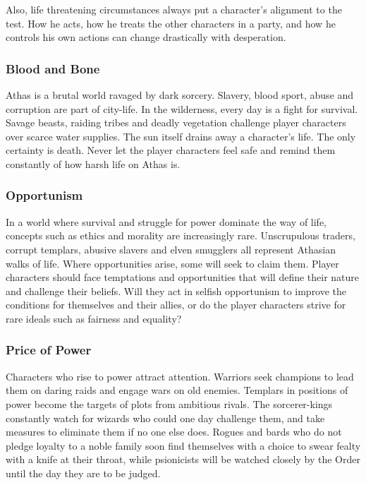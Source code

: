 Also, life threatening circumstances always put a character's alignment to the test. How he acts, how he treats the other characters in a party, and how he controls his own actions can change drastically with desperation.


\subsubsection{Blood and Bone}
Athas is a brutal world ravaged by dark sorcery. Slavery, blood sport, abuse and corruption are part of city-life. In the wilderness, every day is a fight for survival. Savage beasts, raiding tribes and deadly vegetation challenge player characters over scarce water supplies. The sun itself drains away a character's life. The only certainty is death. Never let the player characters feel safe and remind them constantly of how harsh life on Athas is.


\subsubsection{Opportunism}
In a world where survival and struggle for power dominate the way of life, concepts such as ethics and morality are increasingly rare. Unscrupulous traders, corrupt templars, abusive slavers and elven smugglers all represent Athasian walks of life. Where opportunities arise, some will seek to claim them. Player characters should face temptations and opportunities that will define their nature and challenge their beliefs. Will they act in selfish opportunism to improve the conditions for themselves and their allies, or do the player characters strive for rare ideals such as fairness and equality?


\subsubsection{Price of Power}
Characters who rise to power attract attention. Warriors seek champions to lead them on daring raids and engage wars on old enemies. Templars in positions of power become the targets of plots from ambitious rivals. The sorcerer-kings constantly watch for wizards who could one day challenge them, and take measures to eliminate them if no one else does. Rogues and bards who do not pledge loyalty to a noble family soon find themselves with a choice to swear fealty with a knife at their throat, while psionicists will be watched closely by the Order until the day they are to be judged.

